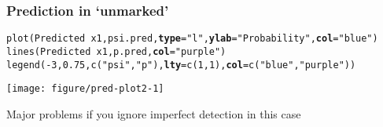 \documentclass[color=usenames,dvipsnames]{beamer}\usepackage[]{graphicx}\usepackage[]{color}
\makeatletter
\newcommand{\hlnum}[1]{\textcolor[rgb]{0.69,0.494,0}{#1}}%
\newcommand{\hlstr}[1]{\textcolor[rgb]{0.749,0.012,0.012}{#1}}%
\newcommand{\hlopt}[1]{\textcolor[rgb]{0,0,0}{#1}}%
\newcommand{\hlstd}[1]{\textcolor[rgb]{0,0,0}{#1}}%
\newcommand{\hlkwc}[1]{\textcolor[rgb]{0,0,0}{\textbf{#1}}}%
\newcommand{\hlkwd}[1]{\textcolor[rgb]{0.004,0.004,0.506}{#1}}%
\newenvironment{kframe}{%
 \def\at@end@of@kframe{}%
 \ifinner\ifhmode%
  \def\at@end@of@kframe{\end{minipage}}%
  \begin{minipage}{\columnwidth}%
 \fi\fi%
 \def\FrameCommand##1{\hskip\@totalleftmargin \hskip-\fboxsep
 \colorbox{shadecolor}{##1}\hskip-\fboxsep
     \hskip-\linewidth \hskip-\@totalleftmargin \hskip\columnwidth}%
 \MakeFramed {\advance\hsize-\width
   \@totalleftmargin\z@ \linewidth\hsize
   \@setminipage}}%
 {\par\unskip\endMakeFramed%
 \at@end@of@kframe}
\newenvironment{knitrout}{}{} %
\makeatother
\begin{document}
\begin{frame}[fragile]
  \frametitle{Prediction in `unmarked'}
\begin{knitrout}\tiny
{}\color{fgcolor}\begin{kframe}
\begin{alltt}
\hlkwd{plot}\hlstd{(Predicted} \hlopt{~} \hlstd{x1, psi.pred,} \hlkwc{type}\hlstd{=}\hlstr{"l"}\hlstd{,} \hlkwc{ylab}\hlstd{=}\hlstr{"Probability"}\hlstd{,} \hlkwc{col}\hlstd{=}\hlstr{"blue"}\hlstd{)}
\hlkwd{lines}\hlstd{(Predicted} \hlopt{~} \hlstd{x1, p.pred,} \hlkwc{col}\hlstd{=}\hlstr{"purple"}\hlstd{)}
\hlkwd{legend}\hlstd{(}\hlopt{-}\hlnum{3}\hlstd{,} \hlnum{0.75}\hlstd{,} \hlkwd{c}\hlstd{(}\hlstr{"psi"}\hlstd{,} \hlstr{"p"}\hlstd{),} \hlkwc{lty}\hlstd{=}\hlkwd{c}\hlstd{(}\hlnum{1}\hlstd{,} \hlnum{1}\hlstd{),} \hlkwc{col}\hlstd{=}\hlkwd{c}\hlstd{(}\hlstr{"blue"}\hlstd{,} \hlstr{"purple"}\hlstd{))}
\end{alltt}
\end{kframe}

{\centering \texttt{[image: figure/pred-plot2-1]} 

}



\end{knitrout}
\pause
\small
\centering
Major problems if you ignore imperfect detection in this case \\
\end{frame}





\end{document}
